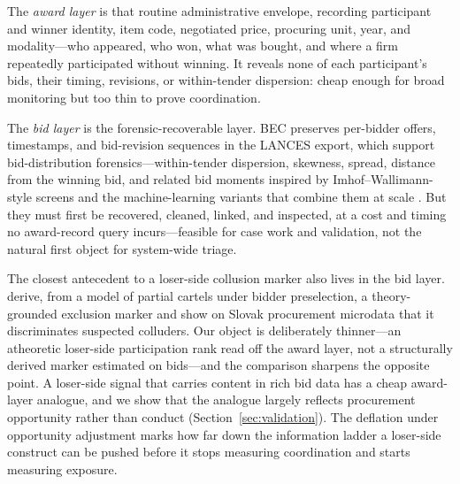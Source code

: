 The \emph{award layer} is that routine administrative envelope,
recording participant and winner identity, item code, negotiated price,
procuring unit, year, and modality---who appeared, who won, what was
bought, and where a firm repeatedly participated without winning. It
reveals none of each participant's bids, their timing, revisions, or
within-tender dispersion: cheap enough for broad monitoring but too
thin to prove coordination.

The \emph{bid layer} is the forensic-recoverable layer. BEC preserves
per-bidder offers, timestamps, and bid-revision sequences in the LANCES
export, which support bid-distribution forensics---within-tender
dispersion, skewness, spread, distance from the winning bid, and
related bid moments inspired by Imhof--Wallimann-style screens
\citep{imhof2018screening,imhof2019detecting} and the machine-learning
variants that combine them at scale
\citep{huber2019machine,wallimann2023machine}. But they must first be
recovered, cleaned, linked, and inspected, at a cost and timing no
award-record query incurs---feasible for case work and validation, not
the natural first object for system-wide triage.

The closest antecedent to a loser-side collusion marker also lives
in the bid layer. \citet{seibel2026collusion} derive, from a model of
partial cartels under bidder preselection, a theory-grounded exclusion
marker and show on Slovak procurement microdata that it discriminates
suspected colluders. Our object is deliberately thinner---an atheoretic
loser-side participation rank read off the award layer, not a
structurally derived marker estimated on bids---and the comparison
sharpens the opposite point. A loser-side signal that carries content
in rich bid data has a cheap award-layer analogue, and we show that the
analogue largely reflects procurement opportunity rather than conduct
(Section~\ref{sec:validation}). The deflation under opportunity
adjustment marks how far down the information ladder a loser-side
construct can be pushed before it stops measuring coordination and
starts measuring exposure.

